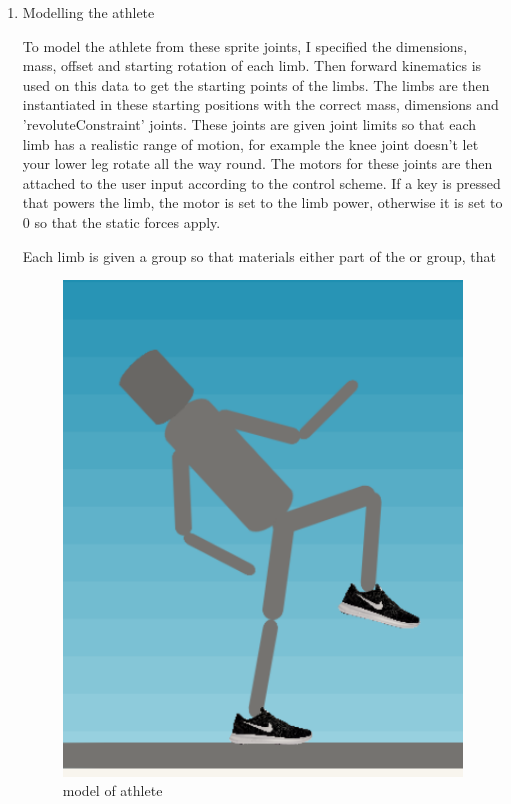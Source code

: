 \documentclass[12pt,a4paper,twoside,openright]{report}
\begin{document}
\begin{enumerate}
	


	\item Modelling the athlete

	To model the athlete from these sprite joints, I specified the dimensions, mass, offset and starting rotation of each limb. Then forward kinematics is used on this data to get the starting points of the limbs. The limbs are then instantiated in these starting positions with the correct mass, dimensions and 'revoluteConstraint' joints. 
	These joints are given joint limits so that each limb has a realistic range of motion, for example the knee joint doesn't let your lower leg rotate all the way round.
	The motors for these joints are then attached to the user input according to the control scheme. If a key is pressed that powers the limb, the motor is set to the limb power, otherwise it is set to 0 so that the static forces apply.

	Each limb is given a group so that materials 
	either part of the  or  group, that 
	
	\begin{figure}[tbh]
	\centerline{\includegraphics[scale=0.5]{athleteModel.PNG}}
	\caption{model of athlete}
	\label{athleteModel}
	\end{figure}


\end{enumerate}
\end{document}

